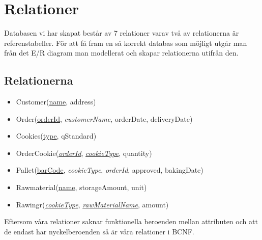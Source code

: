 \section{Relationer}

Databasen vi har skapat består av 7 relationer varav två av relationerna är referenstabeller. För att få fram en så korrekt databas som möjligt utgår man från det E/R diagram man modellerat och skapar relationerna utifrån den.

\subsection{Relationerna}
\begin{itemize}
	
\item{Customer(\underline{name}, address)}
\item{Order(\underline{orderId}, \emph{customerName}, orderDate, deliveryDate)}
\item{Cookies(\underline{type}, qStandard)}
\item{OrderCookie(\underline{\emph{orderId}}, \underline{\emph{cookieType}}, quantity)}
\item{Pallet(\underline{barCode}, \emph{cookieType}, \emph{orderId}, approved, bakingDate)}
\item{Rawmaterial(\underline{name}, storageAmount, unit)}
\item{Rawingr(\underline{\emph{cookieType}}, \underline{\emph{rawMaterialName}}, amount)}

\end{itemize}

Eftersom våra relationer saknar funktionella beroenden mellan attributen och att de endast har nyckelberoenden så är våra relationer i BCNF. 
